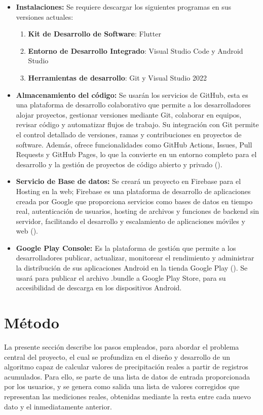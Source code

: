 \begin{itemize}
        \item \textbf{Instalaciones:} Se requiere descargar los siguientes programas en sus versiones actuales: \begin{enumerate}
        \item \textbf{Kit de Desarrollo de Software}: Flutter 
        \item \textbf{Entorno de Desarrollo Integrado}: Visual Studio Code y Android Studio
        \item \textbf{Herramientas de desarrollo}: Git y Visual Studio 2022  
    \end{enumerate}
    \item \textbf{Almacenamiento del código:} Se usarán los servicios de GitHub, esta es una plataforma de desarrollo colaborativo que permite a los desarrolladores alojar proyectos, gestionar versiones mediante Git, colaborar en equipos, revisar código y automatizar flujos de trabajo. Su integración con Git permite el control detallado de versiones, ramas y contribuciones en proyectos de software. Además, ofrece funcionalidades como GitHub Actions, Issues, Pull Requests y GitHub Pages, lo que la convierte en un entorno completo para el desarrollo y la gestión de proyectos de código abierto y privado (\cite{githubdocs}).
    \item \textbf{Servicio de Base de datos:} Se creará un proyecto en Firebase para el Hosting en la web; Firebase es una plataforma de desarrollo de aplicaciones creada por Google que proporciona servicios como bases de datos en tiempo real, autenticación de usuarios, hosting de archivos y funciones de backend sin servidor, facilitando el desarrollo y escalamiento de aplicaciones móviles y web (\cite{firebase}).
    \item \textbf{Google Play Console:} Es la plataforma de gestión que permite a los desarrolladores publicar, actualizar, monitorear el rendimiento y administrar la distribución de sus aplicaciones Android en la tienda Google Play (\cite{googleplayconsole}). Se usará para publicar el archivo .bundle a Google Play Store, para su accesibilidad de descarga en los dispositivos Android.
\end{itemize}

\section{Método}
La presente sección describe los pasos empleados, para abordar el problema central del proyecto, el cual se profundiza en el diseño y desarrollo de un algoritmo capaz de calcular valores de precipitación reales a partir de registros acumulados. Para ello, se parte de una lista de datos de entrada proporcionada por los usuarios, y se genera como salida una lista de valores corregidos que representan las mediciones reales, obtenidas mediante la resta entre cada nuevo dato y el inmediatamente anterior.

